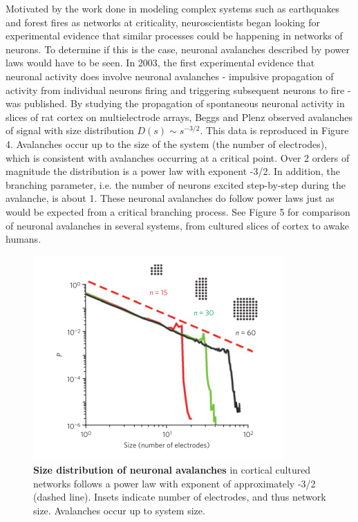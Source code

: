 \documentclass[12pt]{article}
\begin{document}
Motivated by the work done in modeling complex systems such as earthquakes and forest fires as networks at criticality, neuroscientists began looking for experimental evidence that similar processes could be happening in networks of neurons. To determine if this is the case, neuronal avalanches described by power laws would have to be seen. In 2003, the first experimental evidence that neuronal activity does involve neuronal avalanches - impulsive propagation of activity from individual neurons firing and triggering subsequent neurons to fire - was published\cite{Beggs2003b}. By studying the propagation of spontaneous neuronal activity in slices of rat cortex on multielectrode arrays, Beggs and Plenz observed avalanches of signal with size distribution $ D(s) \sim s^{-3/2} $.  This data is reproduced in Figure 4. Avalanches occur up to the size of the system (the number of electrodes), which is consistent with avalanches occurring at a critical point. Over 2 orders of magnitude the distribution is a power law with exponent -3/2. In addition, the branching parameter, i.e. the number of neurons excited step-by-step during the avalanche, is about 1. These neuronal avalanches do follow power laws just as would be expected from a critical branching process. See Figure 5 for comparison of neuronal avalanches in several systems, from cultured slices of cortex to awake humans. 
 
\begin{figure}      
  \begin{center}    
 \includegraphics[width=.6\textwidth]{originalavalancheplenz}    
    \caption{\textbf{Size distribution of neuronal avalanches} in cortical cultured networks follows a power law with exponent of approximately -3/2 (dashed line). Insets indicate number of electrodes, and thus network size. Avalanches occur up to system size. \cite{Beggs2003b}} 
   \label{Figure::Neuronal Avalanches}   
  \end{center}     
   \end{figure}
   
\end{document}
